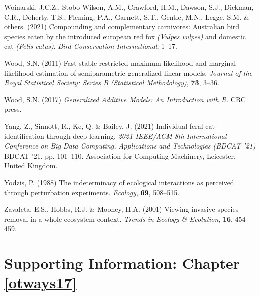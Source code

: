 \documentclass[11pt,a4paper,titlepage,twoside,openright]{style/unimelbthesis}
\begin{document}
\begin{mainmatter}
\leavevmode\hypertarget{ref-woinarski2021compounding}{}%
Woinarski, J.C.Z., Stobo-Wilson, A.M., Crawford, H.M., Dawson, S.J., Dickman, C.R., Doherty, T.S., Fleming, P.A., Garnett, S.T., Gentle, M.N., Legge, S.M. \& others. (2021) Compounding and complementary carnivores: Australian bird species eaten by the introduced european red fox \emph{(Vulpes vulpes)} and domestic cat \emph{(Felis catus)}. \emph{Bird Conservation International}, 1--17.

\leavevmode\hypertarget{ref-wood2011fast}{}%
Wood, S.N. (2011) Fast stable restricted maximum likelihood and marginal likelihood estimation of semiparametric generalized linear models. \emph{Journal of the Royal Statistical Society: Series B (Statistical Methodology)}, \textbf{73}, 3--36.

\leavevmode\hypertarget{ref-wood2017generalized}{}%
Wood, S.N. (2017) \emph{Generalized Additive Models: An Introduction with R}. CRC press.

\leavevmode\hypertarget{ref-yang2021individual}{}%
Yang, Z., Sinnott, R., Ke, Q. \& Bailey, J. (2021) Individual feral cat identification through deep learning. \emph{2021 IEEE/ACM 8th International Conference on Big Data Computing, Applications and Technologies (BDCAT '21)} BDCAT '21. pp. 101--110. Association for Computing Machinery, Leicester, United Kingdom.

\leavevmode\hypertarget{ref-yodzis1988indeterminacy}{}%
Yodzis, P. (1988) The indeterminacy of ecological interactions as perceived through perturbation experiments. \emph{Ecology}, \textbf{69}, 508--515.

\leavevmode\hypertarget{ref-zavaleta2001viewing}{}%
Zavaleta, E.S., Hobbs, R.J. \& Mooney, H.A. (2001) Viewing invasive species removal in a whole-ecosystem context. \emph{Trends in Ecology \& Evolution}, \textbf{16}, 454--459.

\appendix

\setlength{\parindent}{0in}
\setlength{\leftskip}{0in}
\setlength{\parskip}{8pt}

\hypertarget{otways17-app}{%
\chapter{Supporting Information: Chapter \ref{otways17}}\label{otways17-app}}

\newpage

\(~\)

\(~\)

\(~\)
\begin{figure}


\end{figure}
\end{mainmatter}
\end{document}
